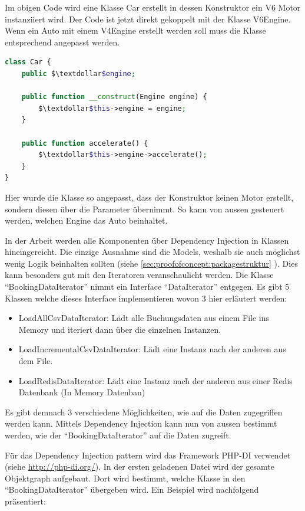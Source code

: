 Im obigen Code wird eine Klasse Car erstellt in dessen Konstruktor ein V6 Motor instanziiert  wird. Der Code ist jetzt direkt gekoppelt mit der Klasse V6Engine. Wenn ein Auto mit einem V4Engine erstellt werden soll muss die Klasse entsprechend angepasst werden. 


\begin{lstlisting}[language=php]
class Car {
	public $\textdollar$engine;
	
	public function __construct(Engine engine) {
		$\textdollar$this->engine = engine;
	}
	
	public function accelerate() {
		$\textdollar$this->engine->accelerate();
	}
}
\end{lstlisting}

Hier wurde die Klasse so angepasst, dass der Konstruktor keinen Motor erstellt, sondern diesen über die Parameter übernimmt. So kann von aussen gesteuert werden, welchen Engine das Auto beinhaltet. 

In der Arbeit werden alle Komponenten über Dependency Injection in Klassen hineingereicht. Die einzige Ausnahme sind die Models, weshalb sie auch möglichst wenig Logik beinhalten sollten (siehe \cref{sec:proofofconcept:packagestruktur} ). Dies kann besonders gut mit den Iteratoren veranschaulicht werden. Die Klasse "`BookingDataIterator"' nimmt ein Interface "`DataIterator"' entgegen. Es gibt 5 Klassen welche dieses Interface implementieren wovon 3 hier erläutert werden:
\begin{itemize}
	\item LoadAllCsvDataIterator: Lädt alle Buchungsdaten aus einem File ins Memory und iteriert dann über die einzelnen Instanzen.
	\item LoadIncrementalCsvDataIterator: Lädt eine Instanz nach der anderen aus dem File.
	\item LoadRedisDataIterator: Lädt eine Instanz nach der anderen aus einer Redis Datenbank (In Memory Datenban)
\end{itemize}

Es gibt demnach 3 verschiedene Möglichkeiten, wie auf die Daten zugegriffen werden kann. Mittels Dependency Injection kann nun von aussen bestimmt werden, wie der "`BookingDataIterator"' auf die Daten zugreift.

Für das Dependency Injection \gls{pattern}
 wird das Framework PHP-DI verwendet (siehe \url{http://php-di.org/}). In der ersten geladenen Datei wird der gesamte Objektgraph aufgebaut. Dort wird bestimmt, welche Klasse in den "`BookingDataIterator"' übergeben wird. Ein Beispiel wird nachfolgend präsentiert:
 
